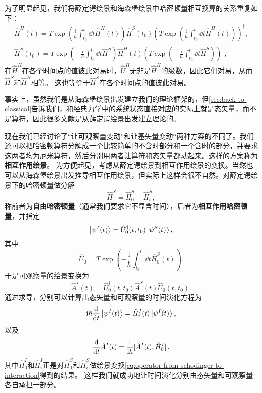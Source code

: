 \documentclass[UTF8, a4paper]{ctexart}
\newcommand*{\ii}{\mathrm{i}}
\begin{document}
为了明显起见，我们将薛定谔绘景和海森堡绘景中哈密顿量相互换算的关系重复如下：
\begin{equation}
    \begin{aligned}
        \hat{H}^H(t) = T \exp \left( \frac{\ii}{\hbar} \int_{t_0}^t \dd{t} \hat{H}^H(t) \right) \hat{H}^S(t_0) \left(T \exp \left( \frac{\ii}{\hbar} \int_{t_0}^t \dd{t} \hat{H}^H(t) \right)\right)^\dagger, \\
        \hat{H}^S(t_0) = T \exp \left( - \frac{\ii}{\hbar} \int_{t_0}^t \dd{t} \hat{H}^S \right) \hat{H}^H(t) \left( T \exp \left( - \frac{\ii}{\hbar} \int_{t_0}^t \dd{t} \hat{H}^S \right)\right)^\dagger,
    \end{aligned}
\end{equation}
在$\hat{H}^H$在各个时间点的值彼此对易时，$\hat{U}^H$无非是$\hat{H}^H$的级数，因此它们对易，从而$\hat{H}^S$和$\hat{H}^H$相等。
这也等价于$\hat{H}^S$在各个时间点的值彼此对易。

事实上，虽然我们是从海森堡绘景出发建立我们的理论框架的，但\autoref{sec:back-to-classical}告诉我们，和经典力学中的系统状态直接对应的实际上就是态矢量，而不是算符，因此很多文献是从薛定谔绘景出发建立理论的。

现在我们已经讨论了“让可观察量变动”和让基矢量变动“两种方案的不同了。我们还可以把哈密顿算符分解成一个比较简单的不含时部分和一个含时的部分，并要求这两者均为厄米算符，然后分别用两者让算符和态矢量都动起来。这样的方案称为\textbf{相互作用绘景}。
为方便起见，考虑从薛定谔绘景到相互作用绘景的变换。当然也可以从海森堡绘景出发推导相互作用绘景，但实际上这样会很不自然。对薛定谔绘景下的哈密顿量做分解
\begin{equation}
    \hat{H}^S = \hat{H}_0^S + \hat{H}_i^S,
\end{equation}
称前者为\textbf{自由哈密顿量}（通常我们要求它不显含时间），后者为\textbf{相互作用哈密顿量}，并指定
\begin{equation}
    \ket{\psi^I(t)} = \hat{U}_0^\dagger(t,t_0) \ket{\psi^S(t)},
\end{equation}
其中
\begin{equation}
    \hat{U}_0 = T \exp \left( - \frac{\ii}{\hbar} \int_{t_0}^t \dd{t} \hat{H}_0^S(t) \right).
\end{equation}
于是可观察量的绘景变换为
\begin{equation}
    \hat{A}^I(t) = \hat{U}_0^\dagger(t,t_0) \hat{A}^S(t) \hat{U}_0(t,t_0).
    \label{eq:operator-from-schodinger-to-interaction}
\end{equation}
通过求导，分别可以计算出态矢量和可观察量的时间演化方程为
\begin{equation}
    \ii \hbar \dv{t} \ket{\psi^I(t)} = \hat{H}^I_i(t) \ket{\psi^I(t)},
    \label{eq:time-evolution-in-interation-picture}
\end{equation}
以及
\begin{equation}
    \dv{t} \hat{A}^I(t) = \frac{1}{\ii \hbar} \comm*{\hat{A}^I(t)}{\hat{H}_0^I}.
\end{equation}
其中$\hat{H}_0^I$和$\hat{H}_i^I$正是对$\hat{H}_0^S$和$\hat{H}_i^S$做绘景变换\eqref{eq:operator-from-schodinger-to-interaction}得到的结果。
这样我们就成功地让时间演化分别由态矢量和可观察量各自承担一部分。
\end{document}
